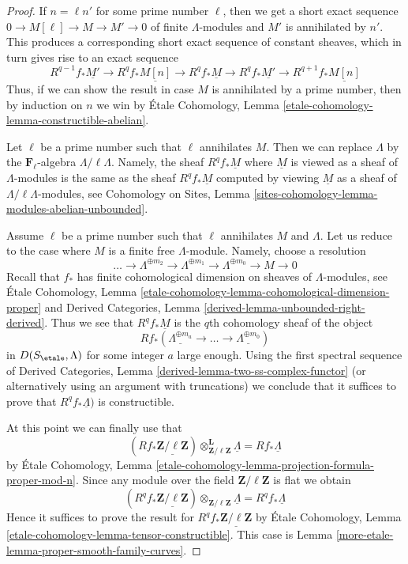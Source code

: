 \begin{proof}
If $n = \ell n'$ for some prime number $\ell$, then
we get a short exact sequence $0 \to M[\ell] \to M \to M' \to 0$
of finite $\Lambda$-modules and $M'$ is annihilated by $n'$.
This produces a corresponding short exact sequence of constant
sheaves, which in turn gives rise to an exact sequence
$$
R^{q - 1}f_*\underline{M'} \to
R^qf_*\underline{M[n]} \to
R^qf_*\underline{M} \to
R^qf_*\underline{M'} \to
R^{q + 1}f_*\underline{M[n]}
$$
Thus, if we can show the result in case $M$ is annihilated by
a prime number, then by induction on $n$ we win by
\'Etale Cohomology, Lemma \ref{etale-cohomology-lemma-constructible-abelian}.

\medskip\noindent
Let $\ell$ be a prime number such that $\ell$ annihilates $M$.
Then we can replace $\Lambda$ by the $\mathbf{F}_\ell$-algebra
$\Lambda/\ell \Lambda$. Namely, the sheaf $R^qf_*\underline{M}$
where $\underline{M}$ is viewed as a sheaf of $\Lambda$-modules
is the same as the sheaf $R^qf_*\underline{M}$ computed by
viewing $\underline{M}$ as a sheaf of $\Lambda/\ell \Lambda$-modules, see
Cohomology on Sites, Lemma
\ref{sites-cohomology-lemma-modules-abelian-unbounded}.

\medskip\noindent
Assume $\ell$ be a prime number such that $\ell$ annihilates $M$ and $\Lambda$.
Let us reduce to the case where $M$ is a finite free $\Lambda$-module.
Namely, choose a resolution
$$
\ldots \to
\Lambda^{\oplus m_2} \to
\Lambda^{\oplus m_1} \to
\Lambda^{\oplus m_0} \to
M \to 0
$$
Recall that $f_*$ has finite cohomological dimension on sheaves of
$\Lambda$-modules, see
\'Etale Cohomology, Lemma
\ref{etale-cohomology-lemma-cohomological-dimension-proper}
and
Derived Categories, Lemma \ref{derived-lemma-unbounded-right-derived}.
Thus we see that $R^qf_*\underline{M}$ is the $q$th cohomology
sheaf of the object
$$
Rf_*(\underline{\Lambda^{\oplus m_a}} \to \ldots \to
\underline{\Lambda^{\oplus m_0}})
$$
in $D(S_\etale, \Lambda)$ for some integer $a$ large enough.
Using the first spectral sequence of
Derived Categories, Lemma \ref{derived-lemma-two-ss-complex-functor}
(or alternatively using an argument with truncations)
we conclude that it suffices to prove that $R^qf_*\underline{\Lambda})$
is constructible.

\medskip\noindent
At this point we can finally use that
$$
(Rf_*\underline{\mathbf{Z}/\ell\mathbf{Z}})
\otimes_{\mathbf{Z}/\ell\mathbf{Z}}^\mathbf{L} \underline{\Lambda} =
Rf_*\underline{\Lambda}
$$
by \'Etale Cohomology, Lemma
\ref{etale-cohomology-lemma-projection-formula-proper-mod-n}.
Since any module over the field $\mathbf{Z}/\ell\mathbf{Z}$
is flat we obtain
$$
(R^qf_*\underline{\mathbf{Z}/\ell\mathbf{Z}})
\otimes_{\mathbf{Z}/\ell\mathbf{Z}} \underline{\Lambda} =
R^qf_*\underline{\Lambda}
$$
Hence it suffices to prove the result for
$R^qf_*\underline{\mathbf{Z}/\ell\mathbf{Z}}$
by \'Etale Cohomology, Lemma \ref{etale-cohomology-lemma-tensor-constructible}.
This case is Lemma \ref{more-etale-lemma-proper-smooth-family-curves}.
\end{proof}

